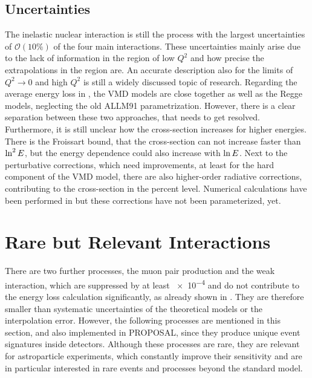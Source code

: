 \subsection{Uncertainties}

The inelastic nuclear interaction is still the process with the largest uncertainties of $\mathcal{O}(10\%)$ of the four main interactions.
These uncertainties mainly arise due to the lack of information in the region of low $Q^2$ and how precise the extrapolations in the region are.
An accurate description also for the limits of $Q^2 \to 0$ and high $Q^2$ is still a widely discussed topic of research.
Regarding the average energy loss in , the VMD models are close together as well as the Regge models, neglecting the old ALLM91 parametrization.
However, there is a clear separation between these two approaches, that needs to get resolved.
Furthermore, it is still unclear how the cross-section increases for higher energies.
There is the Froissart bound, that the cross-section can not increase faster than $\operatorname{ln}^2 E$, but the energy dependence could also increase with $\operatorname{ln} E$.
Next to the perturbative corrections, which need improvements, at least for the hard component of the VMD model, there are also higher-order radiative corrections, contributing to the cross-section in the percent level.
Numerical calculations have been performed in \cite{Sandrock18PhD} but these corrections have not been parameterized, yet.

%
% 
%
%

\section{Rare but Relevant Interactions}

There are two further processes, the muon pair production and the weak interaction, which are suppressed by at least \num{e-4} and do not contribute to the energy loss calculation significantly, as already shown in .
They are therefore smaller than systematic uncertainties of the theoretical models or the interpolation error.
However, the following processes are mentioned in this section, and also implemented in PROPOSAL, since they produce unique event signatures inside detectors.
Although these processes are rare, they are relevant for astroparticle experiments, which constantly improve their sensitivity and are in particular interested in rare events and processes beyond the standard model.

